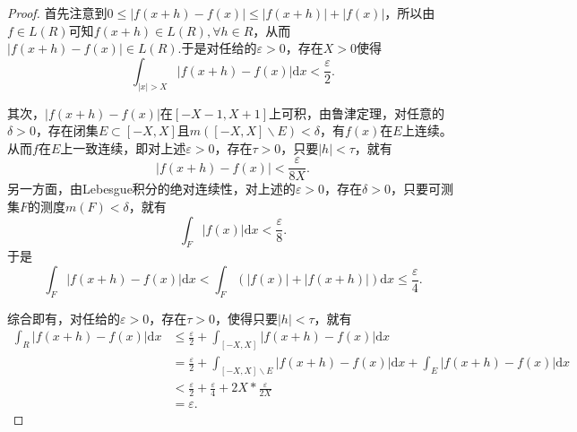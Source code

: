 \begin{proof}
首先注意到$0\leq|f(x+h)-f(x)|\leq|f(x+h)|+|f(x)|$，所以由$f\in L(R)$可知$f(x+h)\in L(R),\forall h\in R$，从而$|f(x+h)-f(x)|\in L(R).$于是对任给的$\varepsilon>0$，存在$X>0$使得$$\int_{|x|>X}|f(x+h)-f(x)|\mathrm{d}x<\frac{\varepsilon}{2}.$$

其次，$|f(x+h)-f(x)|$在$[-X-1,X+1]$上可积，由鲁津定理，对任意的$\delta>0$，存在闭集$E\subset[-X,X]$且$m([-X,X]\backslash E)<\delta$，有$f(x)$在$E$上连续。从而$f$在$E$上一致连续，即对上述$\varepsilon>0$，存在$\tau>0$，只要$|h|<\tau$，就有
$$|f(x+h)-f(x)|<\frac{\varepsilon}{8X}.$$
另一方面，由Lebesgue积分的绝对连续性，对上述的$\varepsilon>0$，存在$\delta>0$，只要可测集$F$的测度$m(F)<\delta$，就有
$$\int_{F}|f(x)|\mathrm{d}x<\frac{\varepsilon}{8}.$$
于是$$\int_{F}|f(x+h)-f(x)|\mathrm{d}x<\int_{F}(|f(x)|+|f(x+h)|)\mathrm{d}x\leq\frac{\varepsilon}{4}.$$

综合即有，对任给的$\varepsilon>0$，存在$\tau>0$，使得只要$|h|<\tau$，就有
\begin{align*}
\int_R|f(x+h)-f(x)|\mathrm{d}x&\leq\frac{\varepsilon}{2}+\int_{[-X,X]}|f(x+h)-f(x)|\mathrm{d}x\\
&=\frac{\varepsilon}{2}+\int_{[-X,X]\backslash E}|f(x+h)-f(x)|\mathrm{d}x+\int_E|f(x+h)-f(x)|\mathrm{d}x\\
&<\frac{\varepsilon}{2}+\frac{\varepsilon}{4}+2X*\frac{\varepsilon}{2X}\\
&=\varepsilon.
\end{align*}
\end{proof}


